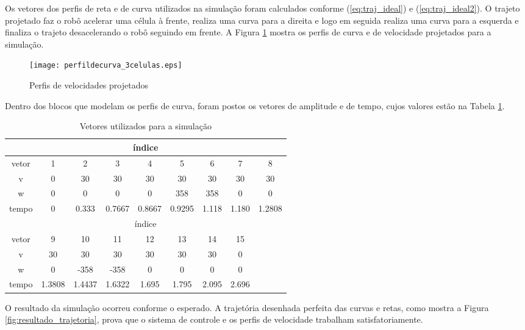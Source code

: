 Os vetores dos perfis de reta e de curva utilizados na simulação foram calculados conforme (\ref{eq:traj_ideal}) e (\ref{eq:traj_ideal2}). O trajeto projetado faz o robô acelerar uma célula à frente, realiza uma curva para a direita e logo em seguida realiza uma curva para a esquerda e finaliza o trajeto desacelerando o robô seguindo em frente. A Figura \ref{fig:3celulas} mostra os perfis de curva e de velocidade projetados para a simulação.

\begin{figure}[!htb]
	\caption{\label{fig:3celulas}Perfis de velocidades projetados}
	\begin{center}
		\texttt{[image: perfildecurva\_3celulas.eps]}
	\end{center}
\end{figure}

Dentro dos blocos que modelam os perfis de curva, foram postos os vetores de amplitude e de tempo, cujos valores estão na Tabela \ref{tab:vetores_perfis_curva}.

\begin{table}[!htb]
	\centering
	\caption{\label{tab:vetores_perfis_curva}Vetores utilizados para a simulação}
\begin{tabular}{c|cccccccc}
 & \multicolumn{7}{c}{índice} &  \\ 
\hline 
vetor & 1 & 2 & 3 & 4 & 5 & 6 & 7 & 8\\ 
\hline 
v & 0 & 30 & 30 & 30 & 30 & 30 & 30 & 30 \\ 
w & 0 & 0 & 0 & 0 & 358 & 358 & 0 & 0 \\ 
\hline 
tempo & 0 & 0.333 & 0.7667 & 0.8667 & 0.9295 & 1.118 & 1.180 & 1.2808\\ 
\hline 
 & \multicolumn{7}{c}{índice} & \\ 
\hline 
vetor & 9 & 10 & 11 & 12 & 13 & 14 & 15 &\\ 
\hline 
v & 30 & 30 & 30 & 30 & 30 & 30 & 0 &\\ 
w & 0 & -358 & -358 & 0 & 0 & 0 & 0 &\\ 
\hline 
tempo & 1.3808 & 1.4437 & 1.6322 & 1.695 & 1.795 & 2.095 & 2.696 &\\ 
\end{tabular} 
\end{table}
O resultado da simulação ocorreu conforme o esperado. A trajetória desenhada perfeita das curvas e retas, como mostra a Figura \ref{fig:resultado_trajetoria}, prova que o sistema de controle e os perfis de velocidade trabalham satisfatoriamente. 

